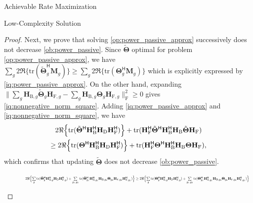\documentclass[journal]{IEEEtran}
\begin{document}
\begin{section}{Achievable Rate Maximization}
\begin{subsection}{Low-Complexity Solution}
\begin{proof}
			Next, we prove that solving \eqref{op:power_passive_approx} successively does not decrease \eqref{ob:power_passive}.
			Since $\tilde{\mathbf{\Theta}}$ optimal for problem \eqref{op:power_passive_approx}, we have $\sum_g 2 \Re\bigl\{ \mathrm{tr}(\tilde{\mathbf{\Theta}}_g^\mathsf{H} \mathbf{M}_g) \bigr\} \ge \sum_g 2 \Re\bigl\{ \mathrm{tr}(\mathbf{\Theta}_g^\mathsf{H} \mathbf{M}_g) \bigr\}$ which is explicitly expressed by \eqref{iq:power_passive_approx}.
			On the other hand, expanding $\lVert \sum_g \mathbf{H}_{\mathrm{B},g} \tilde{\mathbf{\Theta}}_g \mathbf{H}_{\mathrm{F},g} - \sum_g \mathbf{H}_{\mathrm{B},g} \mathbf{\Theta}_g \mathbf{H}_{\mathrm{F},g} \rVert _\mathrm{F}^2 \ge 0$ gives \eqref{iq:nonnegative_norm_square}.
			Adding \eqref{iq:power_passive_approx} and \eqref{iq:nonnegative_norm_square}, we have
			\begin{multline}
				2 \Re \Bigl\{\mathrm{tr}(\tilde{\mathbf{\Theta}}^\mathsf{H} \mathbf{H}_\mathrm{B}^\mathsf{H} \mathbf{H}_\mathrm{D} \mathbf{H}_\mathrm{F}^\mathsf{H}) \Bigr\} + \mathrm{tr}(\mathbf{H}_\mathrm{F}^\mathsf{H} \tilde{\mathbf{\Theta}}^\mathsf{H} \mathbf{H}_\mathrm{B}^\mathsf{H} \mathbf{H}_\mathrm{B} \tilde{\mathbf{\Theta}} \mathbf{H}_\mathrm{F}) \\
				\ge 2 \Re \Bigl\{\mathrm{tr}({\mathbf{\Theta}}^\mathsf{H} \mathbf{H}_\mathrm{B}^\mathsf{H} \mathbf{H}_\mathrm{D} \mathbf{H}_\mathrm{F}^\mathsf{H}) \Bigr\} + \mathrm{tr}(\mathbf{H}_\mathrm{F}^\mathsf{H} {\mathbf{\Theta}}^\mathsf{H} \mathbf{H}_\mathrm{B}^\mathsf{H} \mathbf{H}_\mathrm{B} {\mathbf{\Theta}} \mathbf{H}_\mathrm{F}),
			\end{multline}
			which confirms that updating $\tilde{\mathbf{\Theta}}$ does not decrease \eqref{ob:power_passive}.
			\begin{figure}
				\begin{equation}
					\label{iq:power_passive_approx}
					\resizebox{0.95\textwidth}{!}{
						$2 \Re \Bigl\{\sum\limits_g \mathrm{tr}(\tilde{\mathbf{\Theta}}_g^\mathsf{H} \mathbf{H}_{\mathrm{B},g}^\mathsf{H} \mathbf{H}_\mathrm{D} \mathbf{H}_{\mathrm{F},g}^\mathsf{H}) + \sum\limits_{g_1,g_2} \mathrm{tr}(\tilde{\mathbf{\Theta}}_{g_1}^\mathsf{H} \mathbf{H}_{\mathrm{B},g_1}^\mathsf{H} \mathbf{H}_{\mathrm{B},g_2} \mathbf{\Theta}_{g_2} \mathbf{H}_{\mathrm{F},g_2} \mathbf{H}_{\mathrm{F},g_1}^\mathsf{H})\Bigr\} \ge 2 \Re \Bigl\{\sum\limits_g \mathrm{tr}({\mathbf{\Theta}}_g^\mathsf{H} \mathbf{H}_{\mathrm{B},g}^\mathsf{H} \mathbf{H}_\mathrm{D} \mathbf{H}_{\mathrm{F},g}^\mathsf{H}) + \sum\limits_{g_1,g_2} \mathrm{tr}({\mathbf{\Theta}}_{g_1}^\mathsf{H} \mathbf{H}_{\mathrm{B},g_1}^\mathsf{H} \mathbf{H}_{\mathrm{B},g_2} \mathbf{\Theta}_{g_2} \mathbf{H}_{\mathrm{F},g_2} \mathbf{H}_{\mathrm{F},g_1}^\mathsf{H})\Bigr\}$
}
\end{equation}
\end{figure}
\end{proof}
\end{subsection}
\end{section}
\end{document}
